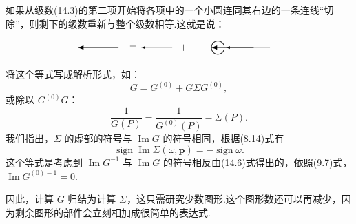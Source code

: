 如果从级数(14.3)的第二项开始将各项中的一个小圆连同其右边的一条连线“切除”，则剩下的级数重新与整个级数相等.这就是说：
\begin{equation}
  \setlength{\unitlength}{0.85pt}%
  \begin{picture}(260,26)(0,0)
    \tarrL{56}{12}{50}%
    \put(74,12){\makebox(0,0){$=$}}%
    \arrL{122}{12}{38}%
    \put(136,12){\makebox(0,0){$+$}}%
    \qbezier(178,4)(185.312,4.688)(186,12)%
    \qbezier(186,12)(185.312,19.312)(178,20)%
    \qbezier(178,20)(170.688,19.312)(170,12)%
    \qbezier(170,12)(170.688,4.688)(178,4)%
    \tarrL{222}{12}{52}%
    \arrL{242}{12}{54}%
  \end{picture}
\end{equation}
将这个等式写成解析形式，如：
\begin{equation}
  G=G^{(0)}+G\Sigma G^{(0)},
\end{equation}
或除以 $G^{(0)}G$：
\begin{equation}
  \frac{1}{G(P)}=\frac{1}{G^{(0)}(P)}-\Sigma(P).
\end{equation}
我们指出，$\Sigma$ 的虚部的符号与 $\operatorname{Im}G$ 的符号相同，根据(8.14)式有
\begin{equation}
  \operatorname{sign}\operatorname{Im}\Sigma(\omega,\bm{p})=-\operatorname{sign}\omega.
\end{equation}
这个等式是考虑到 $\operatorname{Im}G^{-1}$ 与 $\operatorname{Im}G$ 的符号相反由(14.6)式得出的，依照(9.7)式，$\operatorname{Im}G^{(0)-1}=0$.

因此，计算 $G$ 归结为计算 $\Sigma$，这只需研究少数图形.这个图形数还可以再减少，因为剩余图形的部件会立刻相加成很简单的表达式.

